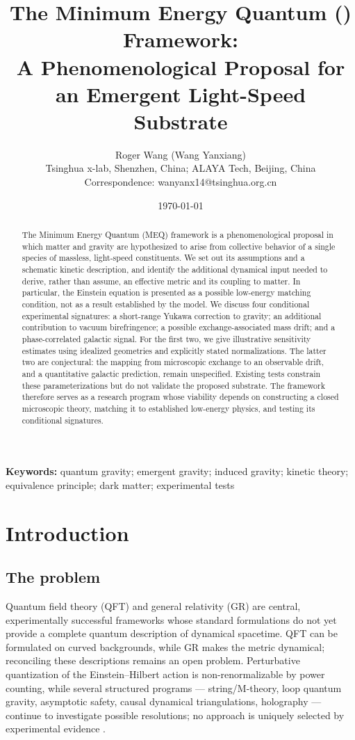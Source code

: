\documentclass[11pt,a4paper]{article}
\title{The Minimum Energy Quantum (\meq{}) Framework:\\
A Phenomenological Proposal for an Emergent Light-Speed Substrate}
\author{Roger Wang (Wang Yanxiang)\\[2pt]
\small Tsinghua x-lab, Shenzhen, China; ALAYA Tech, Beijing, China\\
\small Correspondence: wanyanx14@tsinghua.org.cn}
\date{\today}
\newcommand{\meq}{MEQ}
\begin{document}
\maketitle

\begin{abstract}
\noindent
The Minimum Energy Quantum (\meq{}) framework is a phenomenological proposal in which matter and
gravity are hypothesized to arise from collective behavior of a single species of massless,
light-speed constituents. We set out its assumptions and a schematic kinetic description, and
identify the additional dynamical input needed to derive, rather than assume, an effective metric
and its coupling to matter. In particular, the Einstein equation is presented as a possible
low-energy matching condition, not as a result established by the model. We discuss four
conditional experimental signatures: a short-range Yukawa correction to gravity; an additional
contribution to vacuum birefringence; a possible exchange-associated mass drift; and a
phase-correlated galactic signal. For the first two, we give illustrative sensitivity estimates
using idealized geometries and explicitly stated normalizations. The latter two are conjectural:
the mapping from microscopic exchange to an observable drift, and a quantitative galactic
prediction, remain unspecified. Existing tests constrain these parameterizations but do not
validate the proposed substrate. The framework therefore serves as a research program whose
viability depends on constructing a closed microscopic theory, matching it to established
low-energy physics, and testing its conditional signatures.
\end{abstract}

\noindent\textbf{Keywords:} quantum gravity; emergent gravity; induced gravity; kinetic theory;
equivalence principle; dark matter; experimental tests

\tableofcontents

\section{Introduction}\label{sec:intro}

\subsection{The problem}

Quantum field theory (QFT) and general relativity (GR) are central, experimentally successful
frameworks whose standard formulations do not yet provide a complete quantum description of
dynamical spacetime. QFT can be formulated on curved backgrounds, while GR makes the metric
dynamical; reconciling these descriptions remains an open problem. Perturbative quantization of the
Einstein--Hilbert action is non-renormalizable by power counting, while several structured programs ---
string/M-theory, loop quantum gravity, asymptotic safety, causal dynamical triangulations,
holography --- continue to investigate possible resolutions; no approach is uniquely selected by
experimental evidence \cite{Rovelli2015,Polchinski1998,Reuter1998,Loll2020,Batista2025}.
\end{document}
